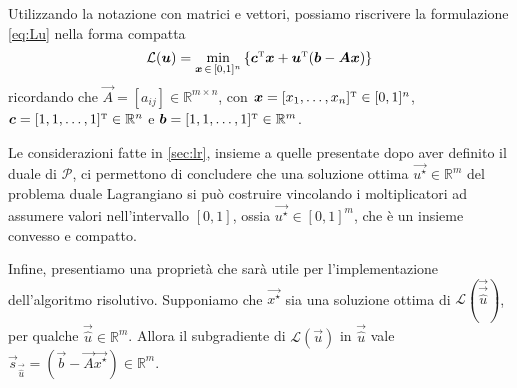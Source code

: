 Utilizzando la notazione con matrici e vettori, possiamo riscrivere la formulazione \eqref{eq:Lu} nella forma compatta
\begin{equation}\label{eq:vecLu}
    \mathcal{L}(\bm{u}) = \min_{\bm{x} \,\in\,[0, 1]^n}\, \{\bm{c}^{\scriptscriptstyle\mathrm{T}}\bm{x} + \bm{u}^{\scriptscriptstyle\mathrm{T}}(\bm{b}-\bm{A}\bm{x})\}
\end{equation}
ricordando che \( \vec{A} = [a_{ij}] \in \mathbb{R}^{m\times n}\), con \( \bm{x} = [x_1, \ldots, x_n]^{\scriptscriptstyle\mathrm{T}} \in
[0, 1]^n \), \( \bm{c} = [1, 1, \ldots, 1]^{\scriptscriptstyle\mathrm{T}} \in \mathbb{R}^n \) e \( \bm{b} = [1, 1, \ldots, 1]^{\scriptscriptstyle\mathrm{T}} \in
\mathbb{R}^m \).

Le considerazioni fatte in \ref{sec:lr}, insieme a quelle presentate dopo aver definito il duale di \( \mathcal{P} \),
ci permettono di concludere che una soluzione ottima \( \vec{u^{\star}} \in \mathbb{R}^m \) del problema duale
Lagrangiano si può costruire vincolando i moltiplicatori ad assumere valori nell'intervallo \( [0, 1] \), ossia  \(
\vec{u^{\star}} \in [0, 1]^m\), che è un insieme convesso e compatto.

Infine, presentiamo una proprietà che sarà utile per l'implementazione dell'algoritmo risolutivo. Supponiamo che \(
\vec{x^{\star}} \) sia una soluzione ottima di \( \mathcal{L}(\vec{\vec{\hat{u}}}) \), per qualche \( \vec{\hat{u}} \in
\mathbb{R}^m \). Allora il subgradiente di \( \mathcal{L}(\vec{u}) \) in \( \vec{\hat{u}} \) vale \(
\vec{s}_{\vec{\hat{u}}} = (\vec{b} - \vec{A}\vec{x^{\star}}) \in \mathbb{R}^m \).

